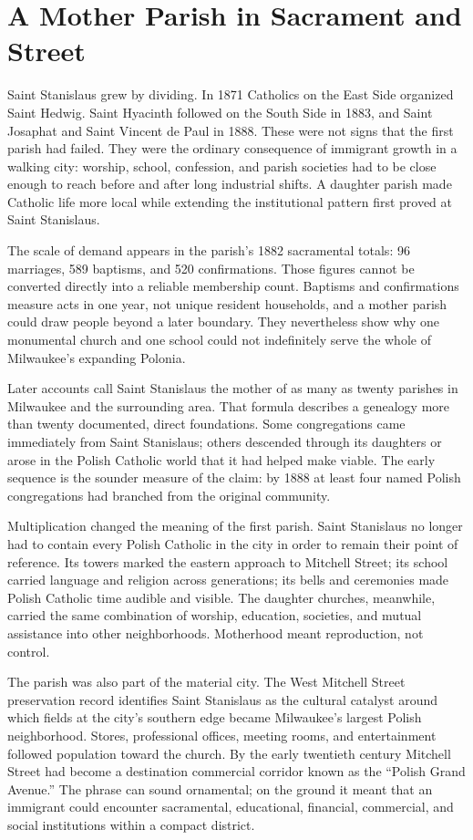 \section{A Mother Parish in Sacrament and Street}

Saint Stanislaus grew by dividing. In 1871 Catholics on the East Side organized Saint Hedwig. Saint Hyacinth followed on the South Side in 1883, and Saint Josaphat and Saint Vincent de Paul in 1888. These were not signs that the first parish had failed. They were the ordinary consequence of immigrant growth in a walking city: worship, school, confession, and parish societies had to be close enough to reach before and after long industrial shifts. A daughter parish made Catholic life more local while extending the institutional pattern first proved at Saint Stanislaus.

The scale of demand appears in the parish's 1882 sacramental totals: 96 marriages, 589 baptisms, and 520 confirmations. Those figures cannot be converted directly into a reliable membership count. Baptisms and confirmations measure acts in one year, not unique resident households, and a mother parish could draw people beyond a later boundary. They nevertheless show why one monumental church and one school could not indefinitely serve the whole of Milwaukee's expanding Polonia.

Later accounts call Saint Stanislaus the mother of as many as twenty parishes in Milwaukee and the surrounding area. That formula describes a genealogy more than twenty documented, direct foundations. Some congregations came immediately from Saint Stanislaus; others descended through its daughters or arose in the Polish Catholic world that it had helped make viable. The early sequence is the sounder measure of the claim: by 1888 at least four named Polish congregations had branched from the original community.

Multiplication changed the meaning of the first parish. Saint Stanislaus no longer had to contain every Polish Catholic in the city in order to remain their point of reference. Its towers marked the eastern approach to Mitchell Street; its school carried language and religion across generations; its bells and ceremonies made Polish Catholic time audible and visible. The daughter churches, meanwhile, carried the same combination of worship, education, societies, and mutual assistance into other neighborhoods. Motherhood meant reproduction, not control.

The parish was also part of the material city. The West Mitchell Street preservation record identifies Saint Stanislaus as the cultural catalyst around which fields at the city's southern edge became Milwaukee's largest Polish neighborhood. Stores, professional offices, meeting rooms, and entertainment followed population toward the church. By the early twentieth century Mitchell Street had become a destination commercial corridor known as the ``Polish Grand Avenue.'' The phrase can sound ornamental; on the ground it meant that an immigrant could encounter sacramental, educational, financial, commercial, and social institutions within a compact district.

